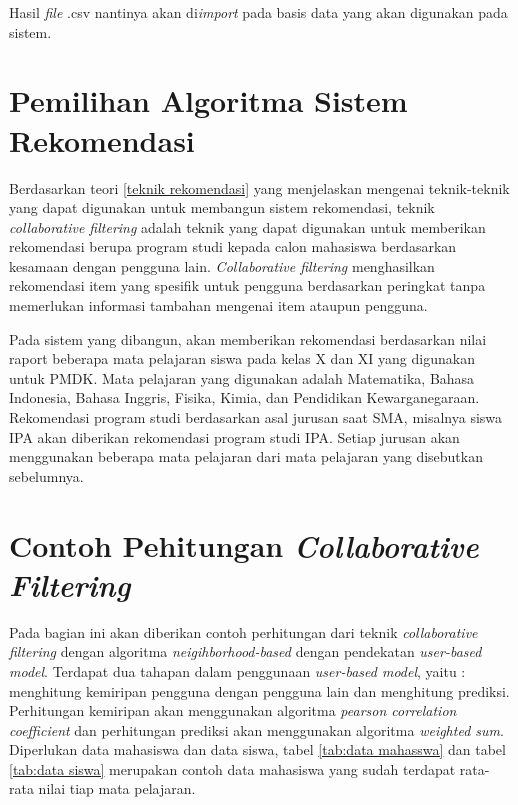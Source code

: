 Hasil \textit{file} .csv nantinya akan di\textit{import} pada basis data yang akan digunakan pada sistem.  

\section{Pemilihan Algoritma Sistem Rekomendasi}
Berdasarkan teori \ref{teknik rekomendasi} yang menjelaskan mengenai teknik-teknik yang dapat digunakan untuk membangun sistem rekomendasi, teknik \textit{collaborative filtering} adalah teknik yang dapat digunakan untuk memberikan rekomendasi berupa program studi kepada calon mahasiswa berdasarkan kesamaan dengan pengguna lain. \textit{Collaborative filtering} menghasilkan rekomendasi item yang spesifik untuk pengguna berdasarkan peringkat tanpa memerlukan informasi tambahan mengenai item ataupun pengguna.

Pada sistem yang dibangun, akan memberikan rekomendasi berdasarkan nilai raport beberapa mata pelajaran siswa pada kelas X dan XI yang digunakan untuk PMDK. Mata pelajaran yang digunakan adalah Matematika, Bahasa Indonesia, Bahasa Inggris, Fisika, Kimia, dan Pendidikan Kewarganegaraan. Rekomendasi program studi berdasarkan asal jurusan saat SMA, misalnya siswa IPA akan diberikan rekomendasi program studi IPA. Setiap jurusan akan menggunakan beberapa mata pelajaran dari mata pelajaran yang disebutkan sebelumnya.

\section{Contoh Pehitungan \textit{Collaborative Filtering}}
\label{subsec:contoh perhitungan}
Pada bagian ini akan diberikan contoh perhitungan dari teknik \textit{collaborative filtering} dengan algoritma \textit{neigihborhood-based} dengan pendekatan \textit{user-based model}. Terdapat dua tahapan dalam penggunaan \textit{user-based model}, yaitu : menghitung kemiripan pengguna dengan pengguna lain dan menghitung prediksi. Perhitungan kemiripan akan menggunakan algoritma \textit{pearson correlation coefficient} dan perhitungan prediksi akan menggunakan algoritma \textit{weighted sum}. Diperlukan data mahasiswa dan data siswa, tabel \ref{tab:data mahasswa} dan tabel \ref{tab:data siswa} merupakan contoh data mahasiswa yang sudah terdapat rata-rata nilai tiap mata pelajaran.

